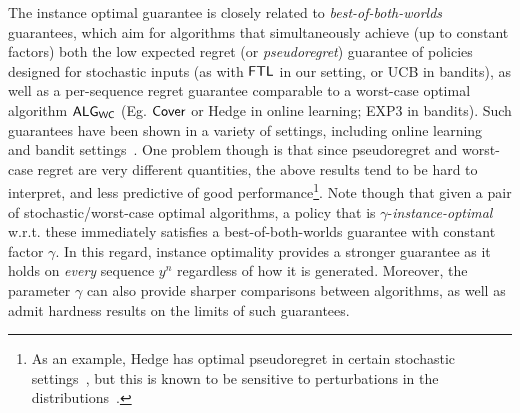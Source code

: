 The instance optimal guarantee is closely related to \emph{best-of-both-worlds} guarantees, which aim for algorithms that simultaneously achieve (up to constant factors) both the low expected regret (or \emph{pseudoregret}) guarantee of policies designed for stochastic inputs (as with $\mathsf{FTL}$ in our setting, or UCB in bandits), as well as a per-sequence regret guarantee comparable to a worst-case optimal algorithm $\mathsf{ALG}_{\mathsf{WC}}$ (Eg. $\mathsf{Cover}$ or Hedge in online learning; EXP$3$ in bandits). 
Such guarantees have been shown in a variety of settings, including online learning~\citep{de2014follow,Orabona--Pal2015,mourtada2019optimality,bilodeau2023relaxing} and bandit settings~\citep{bubeck2012best,Zimmert--Seldin2019,Lykouris--Mirrokni--PaesLeme2018,Dann--Wei--Zimmert2023}.
One problem though is that since pseudoregret and worst-case regret are very different quantities, the above results tend to be hard to interpret, and less predictive of good performance\footnote{As an example, Hedge has optimal pseudoregret in certain stochastic settings~\citep{mourtada2019optimality}, but this is known to be sensitive to perturbations in the distributions~\citep{bilodeau2023relaxing}.}.
Note though that given a pair of stochastic/worst-case optimal algorithms, a policy that is $\gamma$-\emph{instance-optimal} w.r.t. these immediately satisfies a {best-of-both-worlds} guarantee with constant factor $\gamma$. 
In this regard, instance optimality provides a stronger guarantee as it holds on \emph{every} sequence $y^n$ regardless of how it is generated. 
Moreover, the parameter $\gamma$ can also provide sharper comparisons between algorithms, as well as admit hardness results on the limits of such guarantees.




